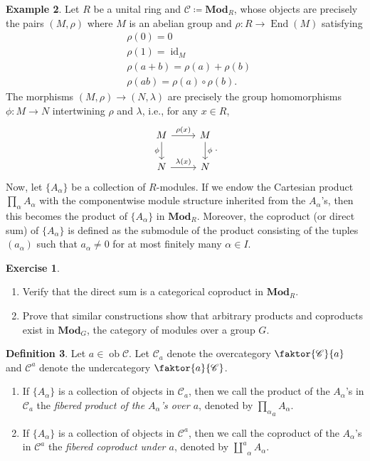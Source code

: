 \documentclass[10pt,letterpaper,cm]{nupset}
\theoremstyle{definition}
\newtheorem{definition}{Definition}[subsection]
\newtheorem{exmp}[definition]{Example}
\theoremstyle{theorem}
\newtheorem{exercise}[definition]{Exercise}
\theoremstyle{remark}
\newcommand{\1}{\mathbf{1}}
\renewcommand{\c}{\mathscr{C}}
\newcommand{\0}{\vec 0}
\DeclareMathOperator{\id}{id}
\DeclareMathOperator{\ed}{End}
\DeclareMathOperator{\ob}{ob}
\begin{document}
\begin{exmp} 
Let $R$ be a unital ring and $\c \coloneqq  \mathbf{Mod}_R$, whose objects are precisely the pairs $(M, \rho)$ where $M$ is an abelian group and $\rho : R \to \ed(M)$ satisfying 
\begin{align*} & \rho(0) = 0  \\ & \rho(1) = \id_M \\  & \rho(a +b) = \rho(a) + \rho(b)  \\ & \rho(ab) = \rho(a) \circ \rho(b). \end{align*} The morphisms $(M, \rho) \to (N, \lambda)$ are precisely the group homomorphisms $\phi : M \to N$ intertwining $\rho$ and $\lambda$, i.e., for any $x \in R$,
\[
\begin{tikzcd}
M \arrow[d, "\phi"'] \arrow[r, "\rho(x)"] & M \arrow[d, "\phi"] \\
N \arrow[r, "\lambda(x)"] & N
\end{tikzcd}.
\]
Now, let $\{A_{\alpha}\}$ be a collection of $R$-modules. If we endow the Cartesian product $\prod_{\alpha} A_{\alpha}$ with the componentwise module structure inherited from the $A_{\alpha}$'s, then this becomes the product of $\{A_{\alpha}\}$ in $\mathbf{Mod}_R$. Moreover, the coproduct (or direct sum) of $\{A_{\alpha}\}$ is defined as the submodule of the product consisting of the tuples $(a_{\alpha})$ such that $a_{\alpha} \ne 0$ for at most finitely many $\alpha \in I$.
\begin{exercise} $ $
\begin{enumerate}
\item Verify that the direct sum is a categorical coproduct in $\mathbf{Mod}_R$.
\item Prove that similar constructions show that arbitrary products and coproducts exist in $\mathbf{Mod}_G$, the category of modules over a group $G$.
\end{enumerate}
\end{exercise}
\end{exmp}

\begin{definition} Let $a \in \ob \c$. Let $\c_a$ denote the overcategory $\faktor{\c}{a}$ and $\c^a$ denote the undercategory $\faktor{a}{\c}$. 
\begin{enumerate}
\item If $\{A_{\alpha}\}$ is a collection of objects in $\c_a$, then we call the product of the $A_{\alpha}$'s in $\c_a$ the \textit{fibered product of the $A_{\alpha}$'s over $a$}, denoted by $\underset{a}{\prod_{\alpha}} A_{\alpha}$.
\item If $\{A_{\alpha}\}$ is a collection of objects in $\c^a$, then we call the coproduct of the $A_{\alpha}$'s in $\c^a$ the \textit{fibered coproduct under $a$}, denoted by $\overset{a}{\coprod}_{\alpha}A_{\alpha}$.
\end{enumerate}
\end{definition}
\end{document}
